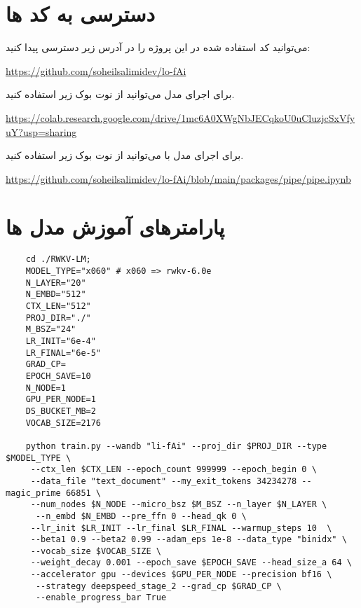 
\section{دسترسی به کد ها}\label{ap:codes}
می‌توانید کد استفاده شده در این پروژه را در آدرس زیر دسترسی پیدا کنید:

\url{https://github.com/soheilsalimidev/lo-fAi}

برای اجرای مدل می‌توانید از نوت‌ بوک زیر استفاده کنید.

\url{https://colab.research.google.com/drive/1mc6A0XWgNbJECqkoU0uCluzjcSxVfyuY?usp=sharing}

برای اجرای مدل با  می‌توانید از نوت‌ بوک زیر استفاده کنید.

\url{https://github.com/soheilsalimidev/lo-fAi/blob/main/packages/pipe/pipe.ipynb}


\section{ پارامترهای آموزش مدل ها}\label{ap:parmas}
\begin{LTR}
  \begin{verbatim}
    cd ./RWKV-LM;
    MODEL_TYPE="x060" # x060 => rwkv-6.0e
    N_LAYER="20"
    N_EMBD="512"
    CTX_LEN="512"
    PROJ_DIR="./"
    M_BSZ="24" 
    LR_INIT="6e-4"
    LR_FINAL="6e-5"
    GRAD_CP=
    EPOCH_SAVE=10
    N_NODE=1
    GPU_PER_NODE=1
    DS_BUCKET_MB=2
    VOCAB_SIZE=2176
    
    python train.py --wandb "li-fAi" --proj_dir $PROJ_DIR --type $MODEL_TYPE \
     --ctx_len $CTX_LEN --epoch_count 999999 --epoch_begin 0 \
     --data_file "text_document" --my_exit_tokens 34234278 --magic_prime 66851 \
     --num_nodes $N_NODE --micro_bsz $M_BSZ --n_layer $N_LAYER \
      --n_embd $N_EMBD --pre_ffn 0 --head_qk 0 \
     --lr_init $LR_INIT --lr_final $LR_FINAL --warmup_steps 10  \
     --beta1 0.9 --beta2 0.99 --adam_eps 1e-8 --data_type "binidx" \
     --vocab_size $VOCAB_SIZE \
     --weight_decay 0.001 --epoch_save $EPOCH_SAVE --head_size_a 64 \
     --accelerator gpu --devices $GPU_PER_NODE --precision bf16 \
      --strategy deepspeed_stage_2 --grad_cp $GRAD_CP \
      --enable_progress_bar True
  \end{verbatim}
\end{LTR}
